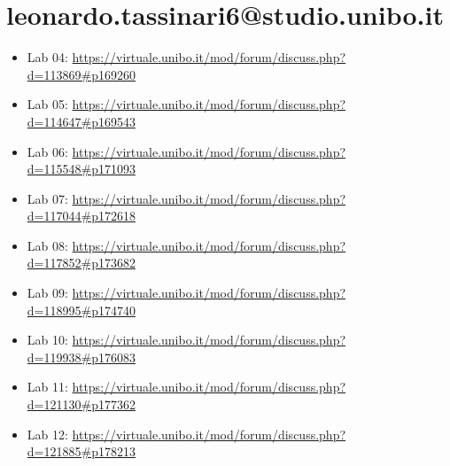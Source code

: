 \documentclass[a4paper,12pt]{report}
\begin{document}
\section*{leonardo.tassinari6@studio.unibo.it}

\begin{itemize}
	\item Lab 04: \url{https://virtuale.unibo.it/mod/forum/discuss.php?d=113869#p169260}
	\item Lab 05: \url{https://virtuale.unibo.it/mod/forum/discuss.php?d=114647#p169543}
	\item Lab 06: \url{https://virtuale.unibo.it/mod/forum/discuss.php?d=115548#p171093}
	\item Lab 07: \url{https://virtuale.unibo.it/mod/forum/discuss.php?d=117044#p172618}
	\item Lab 08: \url{https://virtuale.unibo.it/mod/forum/discuss.php?d=117852#p173682}
	\item Lab 09: \url{https://virtuale.unibo.it/mod/forum/discuss.php?d=118995#p174740}
	\item Lab 10: \url{https://virtuale.unibo.it/mod/forum/discuss.php?d=119938#p176083}
	\item Lab 11: \url{https://virtuale.unibo.it/mod/forum/discuss.php?d=121130#p177362}
	\item Lab 12: \url{https://virtuale.unibo.it/mod/forum/discuss.php?d=121885#p178213}


\end{itemize}
\end{document}
